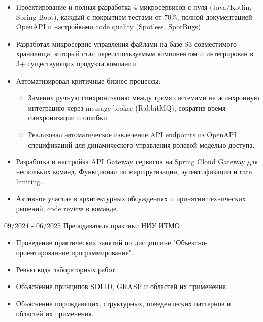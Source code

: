 \documentclass[9pt]{developercv} %
\begin{document}
\begin{entrylist}
{\begin{itemize}[noitemsep,topsep=0pt,parsep=0pt,partopsep=0pt, leftmargin=-1pt]
            \item {Проектирование и полная разработка 4 микросервисов с нуля (Java/Kotlin, Spring Boot), каждый с покрытием тестами от 70\%, полной документацией OpenAPI и настройками code quality (Spotless, SpotBugs).}
            \item {Разработал микросервис управления файлами на базе S3-совместимого хранилища, который стал переиспользуемым компонентом и интегрирован в 3+ существующих продукта компании.}
            \item {Автоматизировал критичные бизнес-процессы:}
                \begin{itemize}[noitemsep,topsep=0pt,parsep=0pt,partopsep=0pt, leftmargin=3pt]
                    \item Заменил ручную синхронизацию между тремя системами на асинхронную интеграцию через message broker (RabbitMQ), сократив время синхронизации и ошибки. 
                    \item Реализовал автоматическое извлечение API endpoints из OpenAPI спецификаций для динамического управления ролевой моделью доступа.
                \end{itemize}
            \item {Разработка и настройка API Gateway сервисов на Spring Cloud Gateway для нескольких команд. Функционал по маршрутизации, аутентификации и rate limiting.}
            \item {Активное участие в архитектурных обсуждениях и принятии технических решений, code review в команде.}
        \end{itemize} 
        }
    \entry
		{09/2024 - 06/2025}
        {Преподаватель практики}
        {НИУ ИТМО}
      {\vspace{-10pt}
        \begin{itemize}[noitemsep,topsep=0pt,parsep=0pt,partopsep=0pt, leftmargin=-1pt]
            \item {Проведение практических занятий по дисциплине "Объектно-ориентированное программирование".}
            \item {Ревью кода лабораторных работ.}
            \item {Объяснение принципов SOLID, GRASP и областей их применения.}
            \item {Объяснение порождающих, структурных, поведенческих паттернов и областей их применения.}
        \end{itemize} 
}
\end{entrylist}
\end{document}
